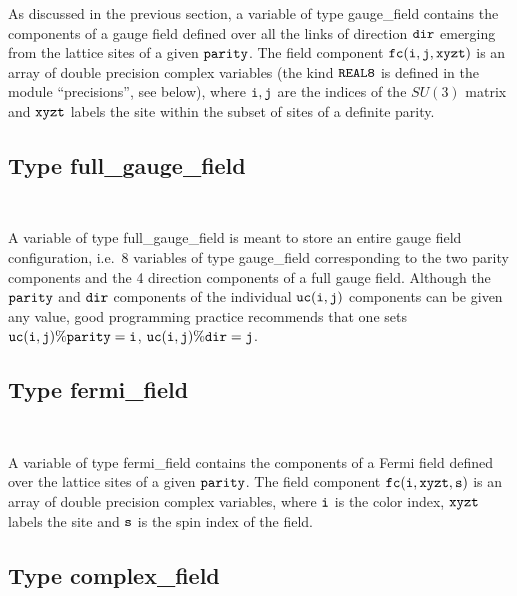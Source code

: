 As discussed in the previous section, a variable of type gauge\_field 
contains the components of a gauge field defined over all the links
of direction $\tt dir$ emerging from the lattice sites  
of a given $\tt parity$.  The field component $\tt fc(i,j,xyzt)$
is an array of double precision complex variables (the kind $\tt REAL8$ is
defined in the module ``precisions'', see below), where 
$\tt i,j$ are the indices of the $SU(3)$ matrix and $\tt xyzt$ labels
the site within the subset of sites of a definite parity.

\subsection{Type full\_gauge\_field}  
\label{typeu}

\vskip 4mm
{\baselineskip 5mm \tt
{}
}

A variable of type full\_gauge\_field is meant to store an entire
gauge field configuration, i.e.~8 variables of type gauge\_field
corresponding to the two parity components and the 4 direction
components of a full gauge field.  Although the $\tt parity$
and $\tt dir$ components of the individual $\tt uc(i,j)$ components
can be given any value, good programming practice recommends that one sets
$\tt uc(i,j)\%parity = i $, $\tt uc(i,j)\%dir = j $.

\subsection{Type fermi\_field}        
\label{typef}
                                         
\vskip 4mm
{\baselineskip 5mm \tt
{}
}

A variable of type fermi\_field 
contains the components of a Fermi field defined over the lattice sites  
of a given $\tt parity$.  The field component $\tt fc(i,xyzt,s)$
is an array of double precision complex variables, where 
$\tt i$ is the color index, $\tt xyzt$ labels
the site and $\tt s$ is the spin index of the field.

\subsection{Type complex\_field}      
\label{typec}
                                         
